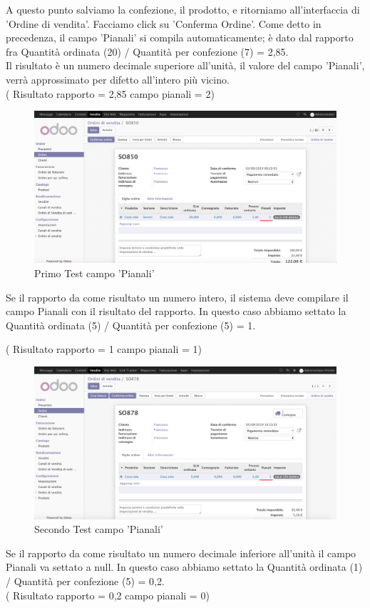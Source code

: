 \newpage
A questo punto salviamo la confezione, il prodotto, e ritorniamo all'interfaccia di 'Ordine di vendita'.
Facciamo click su 'Conferma Ordine'. Come detto in precedenza, il campo 'Pianali' si compila automaticamente; è dato dal rapporto fra Quantità ordinata (20) / Quantità per confezione (7) = 2,85.\\
Il risultato è un numero decimale superiore all'unità, il valore del campo 'Pianali', verrà approssimato per difetto all'intero più vicino.\\
( Risultato rapporto = 2,85  campo pianali = 2)

\begin{figure}[H]
	\begin{center} \includegraphics[scale=0.3]{figures/fifth_test}
		\caption[Primo Test campo 'Pianali']{Primo Test campo 'Pianali'}
		\label{fig:fifth_test}
	\end{center}
\end{figure}
\newpage
Se il rapporto da come risultato un numero intero, il sistema deve compilare il campo Pianali con il risultato del rapporto.
In questo caso abbiamo settato la Quantità ordinata (5) / Quantità per confezione (5) = 1.

( Risultato rapporto = 1 campo pianali = 1)
\begin{figure}[H]
	\begin{center} \includegraphics[scale=0.3]{figures/sixth_test}
		\caption[Secondo Test campo 'Pianali']{Secondo Test campo 'Pianali'}
		\label{fig:sixth_test}
	\end{center}
\end{figure}
\newpage
Se il rapporto da come risultato un numero decimale inferiore all'unità il campo Pianali va settato a null.
In questo caso abbiamo settato la Quantità ordinata (1) / Quantità per confezione (5) = 0,2.\\
( Risultato rapporto = 0,2 campo pianali = 0)

